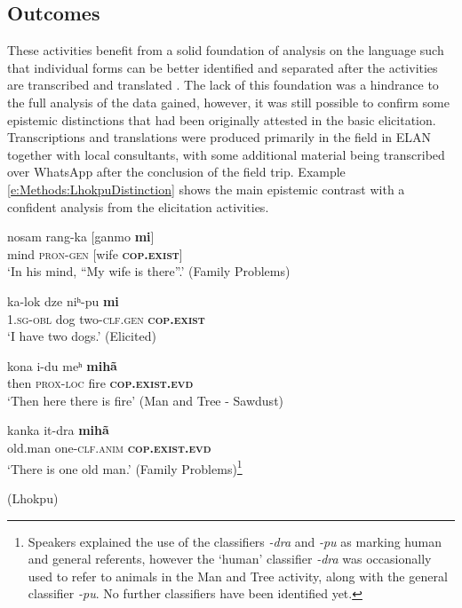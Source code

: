 \subsection{Outcomes}
These activities benefit from a solid foundation of analysis on the language such that individual forms can be better identified and separated after the activities are transcribed and translated \cite{Bodnaruk2023}. The lack of this foundation was a hindrance to the full analysis of the data gained, however, it was still possible to confirm some epistemic distinctions that had been originally attested in the basic elicitation. Transcriptions and translations were produced primarily in the field in ELAN \cite{ELAN} together with local consultants, with some additional material being transcribed over WhatsApp after the conclusion of the field trip. Example \ref{e:Methods:LhokpuDistinction} shows the main epistemic contrast with a confident analysis from the elicitation activities. 

\begin{exe}
  \ex\label{e:Methods:LhokpuDistinction}
  \begin{xlist}
    \ex\label{e:Methods:LhokpuDistinction:mi1}
    \gll nosam rang-ka [ganmo \textbf{mi}] \\
    mind \textsc{pron-gen} [wife \textbf{\textsc{cop.exist}}] \\
    \glt `In his mind, “My wife is there”.' (Family Problems)

    \ex \label{e:Methods:LhokpuDistinction:mi2}
    \gll ka-lok dze niʰ-pu \textbf{mi} \\
    \textsc{1.sg-obl} dog two-\textsc{clf.gen} \textbf{\textsc{cop.exist}} \\
    \glt `I have two dogs.' (Elicited)

    \ex \label{e:Methods:LhokpuDistinction:miha1}
    \gll kona i-du meʰ \textbf{mihã} \\
    then \textsc{prox-loc} fire \textbf{\textsc{cop.exist.evd}} \\
    \glt `Then here there is fire' (Man and Tree - Sawdust)

    \ex \label{e:Methods:LhokpuDistinction:miha2}
    \gll kanka it-dra \textbf{mihã} \\
    old.man one-\textsc{clf.anim}  \textbf{\textsc{cop.exist.evd}} \\
    \glt `There is one old man.' (Family Problems)\footnote{Speakers explained the use of the classifiers \textit{-dra} and \textit{-pu} as marking human and general referents, however the `human' classifier \textit{-dra} was occasionally used to refer to animals in the Man and Tree activity, along with the general classifier \textit{-pu}. No further classifiers have been identified yet.}
  \end{xlist}
  (Lhokpu)
\end{exe}

